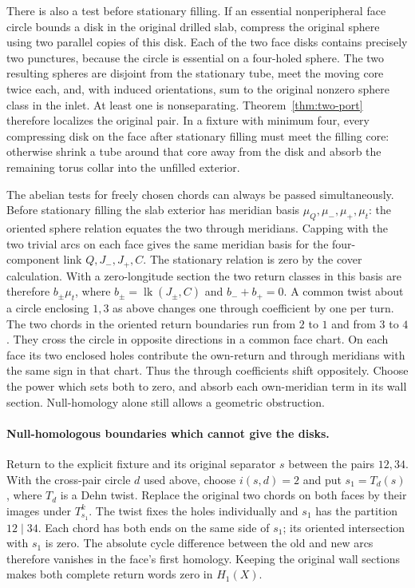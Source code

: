 \documentclass[11pt,letterpaper]{article}
\numberwithin{equation}{section}
\theoremstyle{remark}
\begin{document}
There is also a test before stationary filling. If an essential
nonperipheral face circle bounds a disk in the original drilled slab,
compress the original sphere using two parallel copies of this disk.
Each of the two face disks contains precisely two punctures, because
the circle is essential on a four-holed sphere. The two resulting
spheres are disjoint from the stationary tube, meet the moving
core twice each, and, with induced orientations, sum to the original
nonzero sphere class in the inlet. At least one is nonseparating.
Theorem~\ref{thm:two-port} therefore localizes the original pair.
In a fixture with minimum four, every compressing disk on the face
after stationary filling must meet the filling core: otherwise
shrink a tube around that core away from the disk and absorb the
remaining torus collar into the unfilled exterior.

The abelian tests for freely chosen chords can always be passed
simultaneously. Before stationary filling the slab exterior has
meridian basis \(\mu_Q,\mu_-,\mu_+,\mu_t\): the oriented sphere
relation equates the two through meridians. Capping with the two
trivial arcs on each face gives the same meridian basis for the
four-component link \(Q,J_-,J_+,C\). The stationary relation is
zero by the cover calculation. With a zero-longitude section the
two return classes in this basis are therefore \(b_\pm\mu_t\), where
\(b_\pm=\operatorname{lk}(J_\pm,C)\) and \(b_-+b_+=0\).
A common twist about a circle enclosing \(1,3\) as above changes
one through coefficient by one per turn. The two chords in the oriented return boundaries run from
\(2\) to \(1\) and from \(3\) to \(4\). They cross the circle
in opposite directions in a common face chart. On each face its
two enclosed holes contribute the own-return and through meridians
with the same sign in that chart. Thus the through coefficients
shift oppositely. Choose the power which
sets both to zero, and absorb each own-meridian term in its wall
section. Null-homology alone still allows a geometric obstruction.

\paragraph{Null-homologous boundaries which cannot give the disks.}
Return to the explicit fixture and its original separator \(s\)
between the pairs \(12,34\). With the cross-pair circle \(d\) used
above, choose \(i(s,d)=2\) and put \(s_1=T_d(s)\), where \(T_d\)
is a Dehn twist. Replace the original two chords on both faces by
their images under \(T_{s_1}^k\). The twist fixes the holes
individually and \(s_1\) has the partition \(12\mid34\). Each
chord has both ends on the same side of \(s_1\); its oriented
intersection with \(s_1\) is zero. The absolute cycle difference
between the old and new arcs therefore vanishes in the face's
first homology. Keeping the original wall sections makes both
complete return words zero in \(H_1(X)\).
\end{document}
